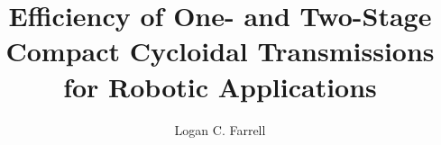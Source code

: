 \documentclass[draft, onecolumn, letterpaper, 12pt]{ruthesis}
\title{Efficiency of One- and Two-Stage Compact Cycloidal Transmissions for Robotic Applications}
\author{Logan C. Farrell}
\begin{document}
  \begin{frontmatter}
   \maketitle
   
   
   \tableofcontents
   \listoffigures
   \listoftables
  \end{frontmatter}



%
%






%
%
%
%
%
%
%
%

\appendix




\end{document}
